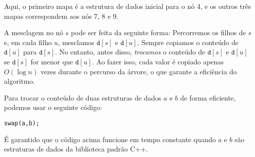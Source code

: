\begin{center}
\end{center}

Aqui, o primeiro mapa é a estrutura de dados inicial para o nó 4, e os outros três mapas correspondem aos nós 7, 8 e 9.

A mesclagem no nó $s$ pode ser feita da seguinte forma: Percorremos os filhos de $s$ e, em cada filho $u$, mesclamos $\texttt{d}[s]$ e $\texttt{d}[u]$. Sempre copiamos o conteúdo de $\texttt{d}[u]$ para $\texttt{d}[s]$. No entanto, antes disso, \emph{trocamos} o conteúdo de $\texttt{d}[s]$ e $\texttt{d}[u]$ se $\texttt{d}[s]$ for menor que $\texttt{d}[u]$. Ao fazer isso, cada valor é copiado apenas $O(\log n)$ vezes durante o percurso da árvore, o que garante a eficiência do algoritmo.

Para trocar o conteúdo de duas estruturas de dados $a$ e $b$ de forma eficiente, podemos usar o seguinte código:
\begin{lstlisting}
swap(a,b);
\end{lstlisting}
É garantido que o código acima funcione em tempo constante quando $a$ e $b$ são estruturas de dados da biblioteca padrão C++.

